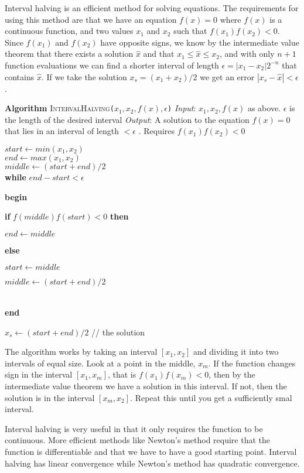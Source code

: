 \documentclass[12pt]{article}
\newcommand{\Lindent}{0.4in}
\newenvironment{Lalgorithm}[4]{
\textbf{Algorithm} \textsc{#1}\texttt{(#2)}\newline
\textit{Input}: #3\newline
\textit{Output}: #4

}{}
\newcommand{\Lgroup}[1]{\textbf{begin}\\\hspace*{\Lindent}\parbox{\textwidth}{#1}\\\textbf{end}}
\newcommand{\Lif}[2]{\textbf{if} #1 \textbf{then}\\\hspace*{\Lindent}\parbox{\textwidth}{#2}}
\newcommand{\Lwhile}[2]{\textbf{while} #1 \\\hspace*{\Lindent}\parbox{\textwidth}{#2}}
\newcommand{\Lelse}[1]{\textbf{else}\\\hspace*{\Lindent}\parbox{\textwidth}{#1}}
\begin{document}
Interval halving is an efficient method for solving equations. The requirements for using this method are that we have an equation $f(x)=0$ where $f(x)$ is a continuous function, and two values $x_1$ and $x_2$ such that $f(x_1)f(x_2)<0$. 
Since $f(x_1)$ and $f(x_2)$ have opposite signs, we know by the intermediate value theorem that there exists a solution $\hat{x}$ and that $x_1 \leq \hat{x}\leq x_2$, and with only $n+1$ function evaluations we can find a shorter interval of length  $\epsilon=|x_1-x_2|2^{-n}$ that contains $\hat{x}$. If we take the solution $x_{s}=(x_1+x_2)/2$ we get an error $ |x_s-\hat{x}|< \epsilon$.


\begin{Lalgorithm}{IntervalHalving}{$x_1,x_2,f(x),\epsilon $}{$x_1, x_2, f(x)$ as above. $\epsilon$ is the length of the desired interval}{A solution to the equation $f(x)=0$ that lies in an interval of length $<\epsilon$ . Requires $f(x_1)f(x_2)<0$}

$start \gets min(x_1,x_2)$ \\
$end \gets max(x_1,x_2)$ \\
$middle \gets (start+end)/2$ \\

\Lwhile{$end-start< \epsilon$}{
\Lgroup{
\Lif{$f(middle)f(start)<0$}{$end \gets middle$}
\Lelse{$start \gets middle$}
$middle \gets (start+end)/2$
}
}
$x_s \gets (start+end)/2$ // the solution
\end{Lalgorithm}



The algorithm works by taking an interval $[x_1,x_2]$ and dividing it into two intervals of equal size. Look at a point in the middle, $x_m$. If the function changes sign in the interval $[x_1,x_m]$, that is $f(x_1)f(x_m)<0$, then by the intermediate value theorem we have a solution in this interval. If not, then the solution is in the interval $[x_m,x_2]$. Repeat this until you get a sufficiently smal interval.



Interval halving is very useful in that it only requires the function to be continuous. More efficient methods like Newton's method require that the function is  differentiable and that we have to have a good starting point.
Interval halving has linear convergence while Newton's method has quadratic convergence.
\end{document}

